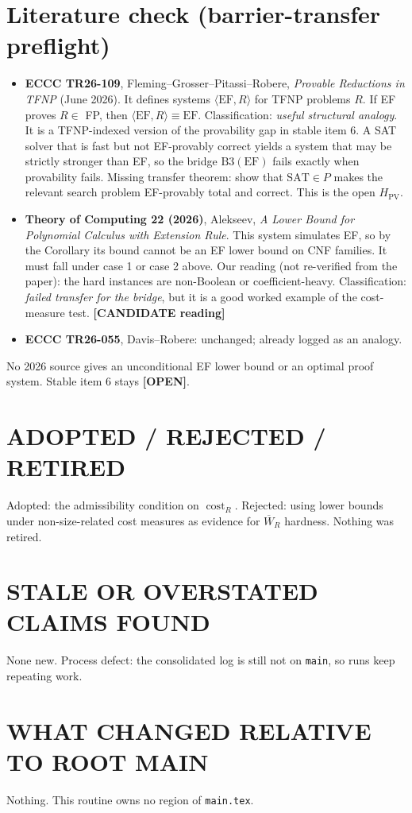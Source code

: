 \documentclass[11pt]{article}
\theoremstyle{remark}\newtheorem*{remark}{Remark}
\newcommand{\Wb}{\overline W}
\newcommand{\status}[1]{\textbf{[#1]}}
\begin{document}
\section{Literature check (barrier-transfer preflight)}
\begin{itemize}
\item \textbf{ECCC TR26-109}, Fleming--Grosser--Pitassi--Robere, \emph{Provable Reductions in TFNP}
(June 2026). It defines systems $\langle\mathrm{EF},R\rangle$ for TFNP problems $R$. If EF proves $R\in$
FP, then $\langle\mathrm{EF},R\rangle\equiv\mathrm{EF}$. Classification: \emph{useful structural
analogy}. It is a TFNP-indexed version of the provability gap in stable item 6. A SAT solver that is fast
but not EF-provably correct yields a system that may be strictly stronger than EF, so the bridge
$\mathrm{B3}(\mathrm{EF})$ fails exactly when provability fails. Missing transfer theorem: show that
$\mathrm{SAT}\in P$ makes the relevant search problem EF-provably total and correct. This is the
open $H_{\mathrm{PV}}$.
\item \textbf{Theory of Computing 22 (2026)}, Alekseev, \emph{A Lower Bound for Polynomial Calculus
with Extension Rule}. This system simulates EF, so by the Corollary its bound cannot be an EF lower
bound on CNF families. It must fall under case 1 or case 2 above. Our reading (not re-verified from
the paper): the hard instances are non-Boolean or coefficient-heavy. Classification: \emph{failed
transfer for the bridge}, but it is a good worked example of the cost-measure test.
\status{CANDIDATE reading}
\item \textbf{ECCC TR26-055}, Davis--Robere: unchanged; already logged as an analogy.
\end{itemize}
No 2026 source gives an unconditional EF lower bound or an optimal proof system. Stable item 6 stays
\status{OPEN}.

\section*{ADOPTED / REJECTED / RETIRED}
Adopted: the admissibility condition on $\operatorname{cost}_R$. Rejected: using lower bounds under
non-size-related cost measures as evidence for $\Wb_R$ hardness. Nothing was retired.

\section*{STALE OR OVERSTATED CLAIMS FOUND}
None new. Process defect: the consolidated log is still not on \texttt{main}, so runs keep repeating work.

\section*{WHAT CHANGED RELATIVE TO ROOT MAIN}
Nothing. This routine owns no region of \texttt{main.tex}.
\end{document}
